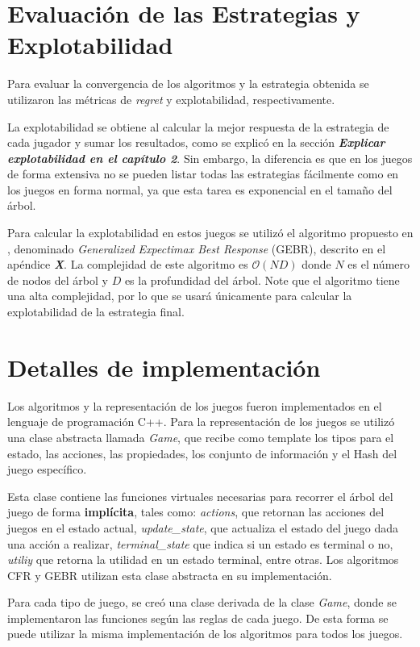 \section{Evaluación de las Estrategias y Explotabilidad}

Para evaluar la convergencia de los algoritmos y la estrategia obtenida se utilizaron las métricas de \textit{regret} y explotabilidad, respectivamente.

La explotabilidad se obtiene al calcular la mejor respuesta de la estrategia de cada jugador y sumar los resultados, como se explicó en la sección \textit{\textbf{Explicar explotabilidad en el capítulo 2}}. Sin embargo, la diferencia es que en los juegos de forma extensiva no se pueden listar todas las estrategias fácilmente como en los juegos en forma normal, ya que esta tarea es exponencial en el tamaño del árbol.

Para calcular la explotabilidad en estos juegos se utilizó el algoritmo propuesto en \cite{bib:thesis-marc-lanctot}, denominado \textit{Generalized Expectimax Best Response} (GEBR), descrito en el apéndice \textit{\textbf{X}}. La complejidad de este algoritmo es $\mathcal{O}(ND)$ donde $N$ es el número de nodos del árbol y $D$ es la profundidad del árbol. Note que el algoritmo tiene una alta complejidad, por lo que se usará únicamente para calcular la explotabilidad de la estrategia final.


\section{Detalles de implementación}
Los algoritmos y la representación de los juegos fueron implementados en el lenguaje de programación C++. Para la representación de los juegos se utilizó una clase abstracta llamada \textit{Game}, que recibe como template los tipos para el estado, las acciones, las propiedades, los conjunto de información y el Hash del juego específico.

Esta clase contiene las funciones virtuales necesarias para recorrer el árbol del juego de forma \textbf{implícita}, tales como: \textit{actions}, que retornan las acciones del juegos en el estado actual, \textit{update\_state}, que actualiza el estado del juego dada una acción a realizar, \textit{terminal\_state} que indica si un estado es terminal o no, \textit{utiliy} que retorna la utilidad en un estado terminal, entre otras. Los algoritmos CFR y GEBR utilizan esta clase abstracta en su implementación.

Para cada tipo de juego, se creó una clase derivada de la clase \textit{Game}, donde se implementaron las funciones según las reglas de cada juego. De esta forma se puede utilizar la misma implementación de los algoritmos para todos los juegos.

